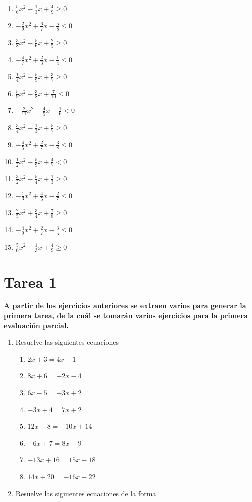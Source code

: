 \documentclass[12pt]{article}
\providecommand{\tightlist}{
  \setlength{\itemsep}{0pt}
  \setlength{\parskip}{0pt}
}
\theoremstyle{plain}
\theoremstyle{definition}
\theoremstyle{remark}
\begin{document}
{\begin{enumerate}
\def\labelenumi{\arabic{enumi}.}
\tightlist
\item
  \(\frac{5}{6}x^2 - \frac{1}{3}x + \frac{4}{9} \geq 0\)
\item
  \(-\frac{2}{9}x^2 + \frac{6}{7}x - \frac{5}{8} \leq 0\)
\item
  \(\frac{3}{8}x^2 - \frac{5}{6}x + \frac{2}{5} \geq 0\)
\item
  \(-\frac{4}{7}x^2 + \frac{2}{3}x - \frac{1}{4} \leq 0\)
\item
  \(\frac{1}{4}x^2 - \frac{5}{9}x + \frac{3}{7} \geq 0\)
\item
  \(\frac{5}{9}x^2 - \frac{3}{8}x + \frac{7}{10} \leq 0\)
\item
  \(-\frac{2}{11}x^2 + \frac{4}{5}x - \frac{1}{6} < 0\)
\item
  \(\frac{3}{4}x^2 - \frac{1}{3}x + \frac{5}{7} \geq 0\)
\item
  \(-\frac{4}{5}x^2 + \frac{2}{7}x - \frac{3}{8} \leq 0\)
\item
  \(\frac{1}{2}x^2 - \frac{5}{9}x + \frac{4}{7} < 0\)
\item
  \(\frac{3}{2}x^2 - \frac{5}{4}x + \frac{1}{3} \geq 0\)
\item
  \(-\frac{1}{3}x^2 + \frac{4}{5}x - \frac{2}{7} \leq 0\)
\item
  \(\frac{2}{5}x^2 + \frac{3}{4}x + \frac{7}{8} \geq 0\)
\item
  \(-\frac{4}{9}x^2 + \frac{2}{7}x - \frac{3}{5} \leq 0\)
\item
  \(\frac{5}{6}x^2 - \frac{1}{3}x + \frac{4}{9} \geq 0\)
\end{enumerate}

\section{Tarea 1}\label{tarea-1}

\textbf{A partir de los ejercicios anteriores se extraen varios para generar la primera tarea, de la cuál se tomarán varios ejercicios para la primera evaluación parcial.}

\begin{enumerate}
\def\labelenumi{\arabic{enumi}.}
\item
  Resuelve las siguientes ecuaciones

  \begin{enumerate}
  \def\labelenumii{\roman{enumii}.}
  \item
    \(2x + 3 = 4x - 1\)
  \item
    \(8x + 6 = -2x - 4\)
  \item
    \(6x - 5 = -3x + 2\)
  \item
    \(-3x + 4 = 7x + 2\)
  \item
    \(12x - 8 = -10x + 14\)
  \item
    \(-6x + 7 = 8x - 9\)
  \item
    \(-13x + 16 = 15x - 18\)
  \item
    \(14x + 20 = -16x - 22\)
  \end{enumerate}
\item
  Resuelve las siguientes ecuaciones de la forma


\end{enumerate}}
\end{document}

